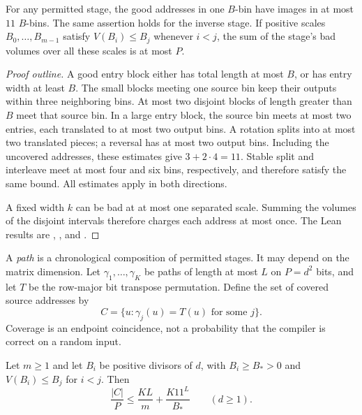 \begin{lemma}
\label{lem:stage-geometry}
For any permitted stage, the good addresses in one $B$-bin have images in
at most $11$ $B$-bins. The same assertion holds for the inverse stage.
If positive scales $B_0,\ldots,B_{m-1}$ satisfy
$V(B_i)\leq B_j$ whenever $i<j$, the sum of the stage's bad volumes over
all these scales is at most $P$.
\end{lemma}

\begin{proof}[Proof outline]
A good entry block either has total length at most $B$, or has entry width
at least $B$. The small blocks meeting one source bin keep their outputs
within three neighboring bins. At most two disjoint blocks of length
greater than $B$ meet that source bin. In a large entry block, the source
bin meets at most two entries, each translated to at most two output
bins. A rotation splits into at most two translated pieces; a reversal
has at most two output bins. Including the uncovered addresses, these estimates give
$3+2\cdot4=11$. Stable split and interleave meet at most four and six
bins, respectively, and therefore satisfy the same bound. All estimates apply in both directions.

A fixed width $k$ can be bad at at most one separated scale. Summing the
volumes of the disjoint intervals therefore charges each address at most
once. The Lean results are
, , and
.
\end{proof}

A \emph{path} is a chronological composition of permitted stages. It may
depend on the matrix dimension. Let $\gamma_1,\ldots,\gamma_K$ be paths
of length at most $L$ on $P=d^2$ bits, and let $T$ be the row-major bit
transpose permutation. Define the set of covered source addresses by
\[
 C=\{u:\gamma_j(u)=T(u)\text{ for some }j\}.
\]
Coverage is an endpoint coincidence, not a probability that the compiler
is correct on a random input.

\begin{theorem}
\label{thm:path-coverage}
Let $m\geq1$ and let $B_i$ be positive divisors of $d$, with
$B_i\geq B_*>0$ and $V(B_i)\leq B_j$ for $i<j$. Then
\begin{equation}
 \label{eq:path-coverage}
 \frac{|C|}{P}\leq\frac{KL}{m}+\frac{K11^L}{B_*}
 \qquad(d\geq1).
\end{equation}
\end{theorem}

